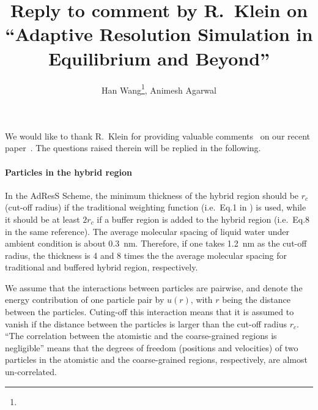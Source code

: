 \documentclass[epjST]{svjour}
\begin{document}
%
\title{Reply to comment by R.~Klein on ``Adaptive Resolution Simulation in Equilibrium and Beyond''}
\author{Han Wang\fnmsep\thanks{}, Animesh Agarwal}
%
%
%
\maketitle
%

We would like to thank R.~Klein for providing valuable comments~\cite{klein2015comment}
on our recent paper~\cite{wang2015adaptive}. 
The questions raised therein will be replied in the following. 

\paragraph{Particles in the hybrid region}
In the AdResS Scheme, the minimum thickness of the hybrid region
should be $r_c$ (cut-off radius) if the traditional weighting function
(i.e.~Eq.1 in \cite{wang2015adaptive}) is used, while it should be at least
$2r_c$ if a buffer region  is added to the hybrid
region (i.e.~Eq.8 in the same reference).
The average molecular spacing of liquid water under ambient
condition is about 0.3~nm. Therefore, if one takes 1.2~nm as the cut-off
radius, the thickness is 4 and 8 times the
the average molecular spacing for traditional and buffered hybrid region, respectively.

We assume that the interactions between particles are pairwise, and denote
the energy contribution of one particle pair by $u(r)$, with $r$ being the distance
between the particles. Cuting-off this interaction means that it is assumed to vanish
if the distance between the particles is larger than the cut-off radius $r_c$.
``The correlation between the atomistic and the coarse-grained
regions is negligible'' means that the
degrees of freedom (positions and velocities) of two particles
in the atomistic and the coarse-grained regions, respectively, are almost un-correlated.
\end{document}
